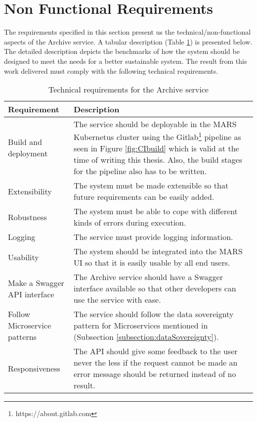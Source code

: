 \section{Non Functional Requirements}
\label{section:technicalReq}
The requirements specified in this section present us the technical/non-functional aspects of the Archive service. A tabular description 
(Table \ref{table: Technical Requirements}) is presented below.
The detailed description depicts the benchmarks of how the system should be designed to meet the needs for a better sustainable system.
The result from this work delivered must comply with the following technical requirements.
\begin{table}[h!]
    \centering
    \begin{tabular}{|p{3cm}|p{12cm}|}
            \hline
                \textbf{Requirement}  & \textbf{Description}\\
            \hline
                 Build and deployment & 
                 The service should be deployable in the MARS Kubernetus \cite{kubernetes} cluster using the Gitlab\footnote{https://about.gitlab.com} pipeline as seen in Figure \ref{fig:CIbuild}
                 which is valid at the time of writing this thesis. Also,
                 the build stages for the pipeline also has to be written. \\
            \hline
                 Extensibility & The system must be made extensible so that future requirements can be easily added.\\
            \hline
                 Robustness & The system must be able to cope with different kinds of errors during execution.\\    
            \hline
                 Logging &  The service must provide logging information.\\    
            \hline
                 Usability & The system should be integrated into the MARS UI so that it is easily usable by all end users.\\     
            \hline
                 Make a Swagger API interface & The Archive service should have a Swagger \cite{swagger} interface available so that other 
                 developers can use the service with ease.\\         
            \hline
                Follow Microservice patterns & The service should follow the data sovereignty pattern for Microservices mentioned in 
                (Subsection \ref{subsection:dataSovereignty}).\\ 
            \hline
                Responsiveness & The API should give some feedback to the user never the less if the request cannot be made an 
                error message should be returned instead of no result.\\      
            \hline
           
    \end{tabular} 
    \caption{Technical requirements for the Archive service}
    \label{table: Technical Requirements}  
    \end{table} 
  
    